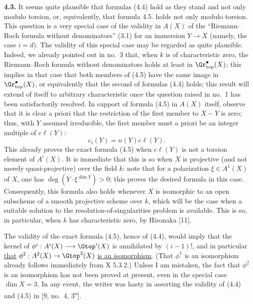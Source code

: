 \textbf{4.3.} It seems quite plausible that formulas (4.4) hold as they stand and not only modulo torsion, or, equivalently, that formula 4.5. holds not only modulo torsion. This question is a very special case of the validity in $A(X)$ of the ``Riemann--Roch formula without denominators'' (3.1) for an immersion $Y\to X$ (namely, the case $i=d$). The validity of this special case may be regarded as quite plausible. Indeed, we already pointed out in no.~3 that, when $k$ is of characteristic zero, the Riemann--Roch formula without denominators holds at least in $\Gr^{\bullet}_{\mathrm{top}}(X)$; this implies in that case that both members of (4.5) have the same image in $\Gr^{\bullet}_{\mathrm{top}}(X)$, or equivalently that the second of formulas (4.4) holds; this result will extend of itself to arbitrary characteristic once
%
the question raised in no.~1 has been satisfactorily resolved. In support of formula (4.5) in $A(X)$ itself, observe that it is clear a priori that the restriction of the first member to $X-Y$ is zero; thus, with $Y$ assumed irreducible, the first member must a priori be an integer multiple of $\mathrm{c}\ell(Y)$:
\[
 c_i(Y)=n(Y)\mathrm{c}\ell(Y).
\]
This already proves the exact formula (4.5) when $\mathrm{c}\ell(Y)$ is not a torsion element of $A^i(X)$. It is immediate that this is so when $X$ is projective (and not merely quasi-projective) over the field $k$: note that for a polarization $\xi\in A^1(X)$ of $X$, one has $\deg(Y\cdot\xi^{\dim Y})>0$; this proves the desired formula in this case. Consequently, this formula also holds whenever $X$ is isomorphic to an open subscheme of a smooth projective scheme over $k$, which will be the case when a suitable solution to the resolution-of-singularities problem is available. This is so, in particular, when $k$ has characteristic zero, by Hironaka [11].

The validity of the exact formula (4.5), hence of (4.4), would imply that the kernel of $\phi^i:A^i(X)\longrightarrow \Gtop^i(X)$ is annihilated by $(i-1)!$, and in particular \uline{that} $\phi^2:A^2(X)\to\Gtop^2(X)$ \uline{is an isomorphism}. (That $\phi^1$ is an isomorphism already follows immediately from X 5.3.2.) Unless I am mistaken, the fact that $\phi^2$ is an isomorphism has not been proved at present, even in the special case $\dim X=3$. In any event, the writer was hasty in asserting the validity of (4.4) and (4.5) in [9, no.~4, 3\textsuperscript{o}].

